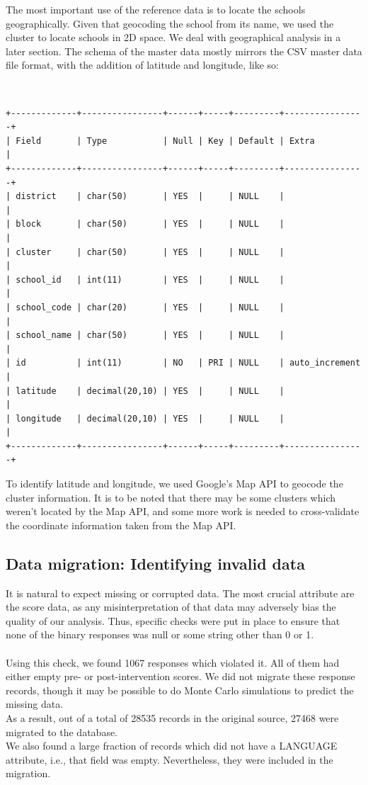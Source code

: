 \documentclass[10pt]{article}
\begin{document}
The most important use of the reference data is to locate the schools geographically. Given that geocoding the school from its name, we used the cluster to locate schools in 2D space. We deal with geographical analysis in a later section. The schema of the master data mostly mirrors the CSV master data file format, with the addition of latitude and longitude, like so:

{\tt
\begin{verbatim}
+-------------+----------------+------+-----+---------+----------------+
| Field       | Type           | Null | Key | Default | Extra          |
+-------------+----------------+------+-----+---------+----------------+
| district    | char(50)       | YES  |     | NULL    |                |
| block       | char(50)       | YES  |     | NULL    |                |
| cluster     | char(50)       | YES  |     | NULL    |                |
| school_id   | int(11)        | YES  |     | NULL    |                |
| school_code | char(20)       | YES  |     | NULL    |                |
| school_name | char(50)       | YES  |     | NULL    |                |
| id          | int(11)        | NO   | PRI | NULL    | auto_increment |
| latitude    | decimal(20,10) | YES  |     | NULL    |                |
| longitude   | decimal(20,10) | YES  |     | NULL    |                |
+-------------+----------------+------+-----+---------+----------------+
\end{verbatim}
}

To identify latitude and longitude, we used Google's Map API to geocode the cluster information. It is to be noted that there may be some clusters which weren't located by the Map API, and some more work is needed to cross-validate the coordinate information taken from the Map API.

\subsection{Data migration: Identifying invalid data}
\label{sec:InvalidData}
It is natural to expect missing or corrupted data. The most crucial attribute are the score data, as any misinterpretation of that data may adversely bias the quality of our analysis. Thus, specific checks were put in place to ensure that none of the binary responses was null or some string other than 0 or 1.\\\\
Using this check, we found 1067 responses which violated it. All of them had either empty pre- or post-intervention scores. We did not migrate these response records, though it may be possible to do Monte Carlo simulations to predict the missing data.\\
As a result, out of a total of 28535 records in the original source, 27468 were migrated to the database.\\
We also found a large fraction of records which did not have a LANGUAGE attribute, i.e., that field was empty. Nevertheless, they were included in the migration.
\end{document}
